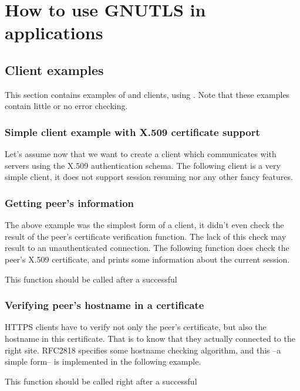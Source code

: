 \chapter{How to use GNUTLS in applications}
\section{Client examples}
This section contains examples of \tls{} and \ssl{} clients, using \gnutls{}. 
Note that these examples contain little or no error checking.

\subsection{Simple client example with X.509 certificate support}
Let's assume now that we want to create a client which communicates
with servers using the X.509 authentication schema. The following client
is a very simple \tls{} client, it does not support session resuming nor
any other fancy features.


\subsection{Getting peer's information}
\par The above example was the simplest form of a client, it didn't even check
the result of the peer's certificate verification function. The lack of
this check may result to an unauthenticated connection.
The following function does check the peer's
X.509 certificate, and prints some information about the current session.
\par
This function should be called after a successful



\subsection{Verifying peer's hostname in a certificate}
\par HTTPS clients have to verify not only the peer's certificate,
but also the hostname in this certificate. That is to know that
they actually connected to the right site.
RFC2818 specifies some hostname checking algorithm, and this --a simple form--
is implemented in the following example.

\par
This function should be called right after a successful

